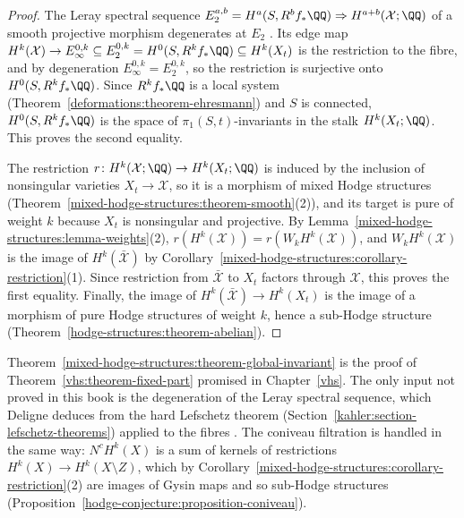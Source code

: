 \begin{proof}
The Leray spectral sequence $E_2^{a,b} = H^a(S, R^bf_*\QQ) \Rightarrow H^{a+b}(\mathcal{X}; \QQ)$ of a smooth projective morphism degenerates at $E_2$ \cite{deligne-1968}. Its edge map
$H^k(\mathcal{X}) \to E_\infty^{0,k} \subseteq E_2^{0,k} = H^0(S, R^kf_*\QQ) \subseteq H^k(X_t)$ is the restriction to the fibre, and by degeneration $E_\infty^{0,k} = E_2^{0,k}$, so the restriction is
surjective onto $H^0(S, R^kf_*\QQ)$. Since $R^kf_*\QQ$ is a local system (Theorem~\ref{deformations:theorem-ehresmann}) and $S$ is connected, $H^0(S, R^kf_*\QQ)$ is the space of $\pi_1(S, t)$-invariants in the stalk
$H^k(X_t; \QQ)$. This proves the second equality.

The restriction $r \colon H^k(\mathcal{X}; \QQ) \to H^k(X_t; \QQ)$ is induced by the inclusion of nonsingular varieties $X_t \to \mathcal{X}$, so it is a morphism of mixed Hodge structures
(Theorem~\ref{mixed-hodge-structures:theorem-smooth}(2)), and its target is pure of weight $k$ because $X_t$ is nonsingular and projective. By Lemma~\ref{mixed-hodge-structures:lemma-weights}(2),
$r(H^k(\mathcal{X})) = r(W_kH^k(\mathcal{X}))$, and $W_kH^k(\mathcal{X})$ is the image of $H^k(\bar{\mathcal{X}})$ by Corollary~\ref{mixed-hodge-structures:corollary-restriction}(1). Since restriction from
$\bar{\mathcal{X}}$ to $X_t$ factors through $\mathcal{X}$, this proves the first equality. Finally, the image of $H^k(\bar{\mathcal{X}}) \to H^k(X_t)$ is the image of a morphism of pure Hodge structures of
weight $k$, hence a sub-Hodge structure (Theorem~\ref{hodge-structures:theorem-abelian}).
\end{proof}

\begin{remark}\label{mixed-hodge-structures:remark-fixed-part}
Theorem~\ref{mixed-hodge-structures:theorem-global-invariant} is the proof of Theorem~\ref{vhs:theorem-fixed-part} promised in Chapter~\ref{vhs}. The only input not proved in this book is the degeneration
of the Leray spectral sequence, which Deligne deduces from the hard Lefschetz theorem (Section~\ref{kahler:section-lefschetz-theorems}) applied to the fibres \cite{deligne-1968}. The coniveau filtration is handled in
the same way: $N^cH^k(X)$ is a sum of kernels of restrictions $H^k(X) \to H^k(X \setminus Z)$, which by Corollary~\ref{mixed-hodge-structures:corollary-restriction}(2) are images of Gysin maps and so
sub-Hodge structures (Proposition~\ref{hodge-conjecture:proposition-coniveau}).
\end{remark}


